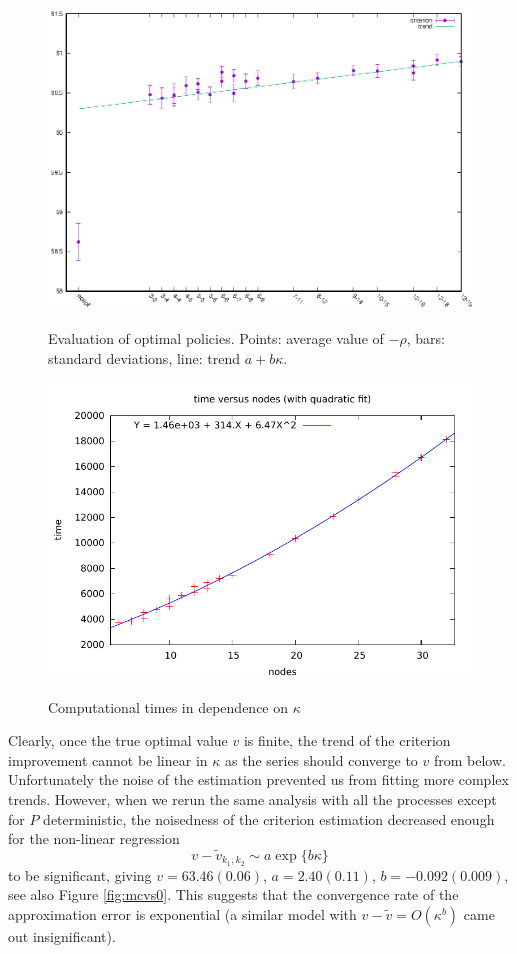\documentclass{article}              %
\begin{document}
\begin{figure}
\begin{center}
\includegraphics{mcvs025}

\label{fig:mcvs}\caption{Evaluation of optimal policies. Points: average value of $-\rho$, bars: standard deviations, line: trend $a+b\kappa$.}
\end{center}
\end{figure}

\begin{figure}
\begin{center}
\includegraphics{times}\label{fig:times}\caption{Computational times in dependence on $\kappa$}
\end{center}
\end{figure}

Clearly, once the true optimal value $v$ is finite, the trend of the criterion improvement
cannot be linear in $\kappa$ as the series should converge
to $v$ from below. Unfortunately the noise of the estimation
prevented us from fitting more complex trends. However, when we rerun
the same analysis with all the processes except for $P$
deterministic, the noisedness of the criterion estimation decreased enough for the non-linear regression
\[
v-\tilde{v}_{k_1,k_2}\sim a\exp\{b\kappa\}
\]
to be significant, giving $v=63.46(0.06)$, $a=2.40(0.11)$, $b=-0.092(0.009)$, see also Figure \ref{fig:mcvs0}. This suggests that the convergence
rate of the approximation error is exponential (a similar model with
$v-\tilde{v}=O(\kappa^{b})$ came out insignificant). 
\end{document}
